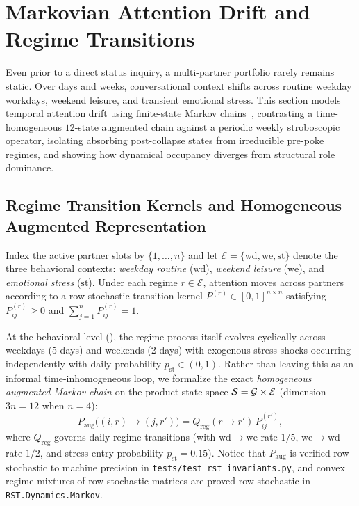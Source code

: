\section{Markovian Attention Drift and Regime Transitions}
\label{sec:dynamics}

Even prior to a direct status inquiry, a multi-partner portfolio rarely remains static.
Over days and weeks, conversational context shifts across routine weekday workdays,
weekend leisure, and transient emotional stress. This section models temporal attention
drift using finite-state Markov chains~\citep{kemeny1960finite,levin2017markov,ross1996stochastic},
contrasting a time-homogeneous $12$-state augmented chain against a periodic weekly
stroboscopic operator, isolating absorbing post-collapse states from irreducible pre-poke
regimes, and showing how dynamical occupancy diverges from structural role dominance.

\subsection{Regime Transition Kernels and Homogeneous Augmented Representation}
\label{subsec:dyn-regimes}

\noindent\layerformal{} Index the active partner slots by $\{1, \dots, n\}$ and let
$\mathcal{E} = \{\mathrm{wd}, \mathrm{we}, \mathrm{st}\}$ denote the three behavioral
contexts: \emph{weekday routine} ($\mathrm{wd}$), \emph{weekend leisure} ($\mathrm{we}$),
and \emph{emotional stress} ($\mathrm{st}$). Under each regime $r \in \mathcal{E}$,
attention moves across partners according to a row-stochastic transition kernel $P^{(r)}
\in [0, 1]^{n \times n}$ satisfying $P_{ij}^{(r)} \ge 0$ and $\sum_{j=1}^n P_{ij}^{(r)} = 1$.

At the behavioral level (\layerbehav{}), the regime process itself evolves cyclically across
weekdays (5 days) and weekends (2 days) with exogenous stress shocks occurring independently
with daily probability $p_{\mathrm{st}} \in (0, 1)$. Rather than leaving this as an informal
time-inhomogeneous loop, we formalize the exact \emph{homogeneous augmented Markov chain}
on the product state space $\mathcal{S} = \mathcal{G} \times \mathcal{E}$ (dimension $3n = 12$
when $n = 4$):
\begin{equation}
  P_{\mathrm{aug}}\bigl((i, r) \to (j, r')\bigr)
  = Q_{\mathrm{reg}}(r \to r') \, P_{ij}^{(r')},
  \label{eq:daily-kernels}
\end{equation}
where $Q_{\mathrm{reg}}$ governs daily regime transitions (with $\mathrm{wd} \to \mathrm{we}$
rate $1/5$, $\mathrm{we} \to \mathrm{wd}$ rate $1/2$, and stress entry probability
$p_{\mathrm{st}} = 0.15$). Notice that $P_{\mathrm{aug}}$ is verified row-stochastic
to machine precision in \texttt{tests/test\_rst\_invariants.py}, and convex regime mixtures
of row-stochastic matrices are proved row-stochastic in \texttt{RST.Dynamics.Markov}.

